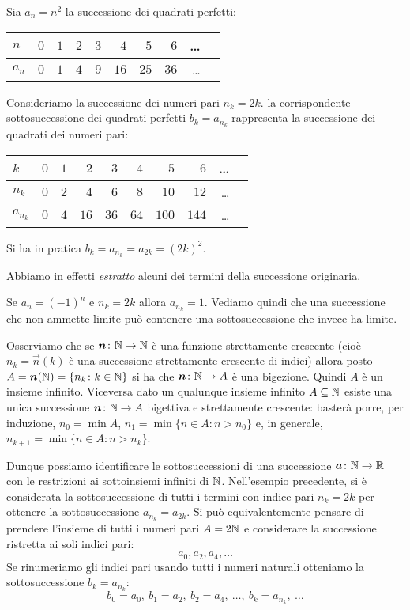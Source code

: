 \begin{example}
Sia $a_n = n^2$ la successione dei quadrati perfetti:
\begin{center}
\begin{tabular}{l|rrrrrrrrr}
$n$   & $0$ & $1$ & $2$ & $3$ & $4$  & $5$  & $6$  & \dots \\ \hline
$a_n$ & $0$ & $1$ & $4$ & $9$ & $16$ & $25$ & $36$ & \dots
\end{tabular}
\end{center}
Consideriamo la successione dei numeri pari $n_k = 2k$.
la corrispondente sottosuccessione dei quadrati perfetti
$b_k = a_{n_k}$
rappresenta la successione dei quadrati dei numeri pari:
\begin{center}
\begin{tabular}{l|rrrrrrrrr}
$k$       & $0$ & $1$ & $2$ & $3$ & $4$  & $5$  & $6$  & \dots \\ \hline
$n_k$ & $0$ & $2$ & $4$ & $6$ & $8$ & $10$ & $12$ & \dots \\
$a_{n_k}$ & $0$ & $4$ & $16$ & $36$ & $64$ & $100$ & $144$ & \dots
\end{tabular}
\end{center}
Si ha in pratica
  $b_k = a_{n_k} = a_{2k} = (2k)^2$.

Abbiamo in effetti \emph{estratto} alcuni dei termini della successione
originaria.
\end{example}

\begin{example}
Se $a_n = (-1)^n$ e $n_k=2k$ allora $a_{n_k} = 1$.
Vediamo quindi che una successione che non ammette limite
può contenere una sottosuccessione che invece ha limite.
\end{example}

Osserviamo che se $\boldsymbol n\colon \mathbb N\to \mathbb N$ è una
funzione strettamente crescente
(cioè $n_k=\vec n(k)$ è una successione strettamente crescente di indici)
allora posto $A=\boldsymbol n(\mathbb N)=\{n_k\colon k\in \mathbb N\}$ si ha che
$\boldsymbol n \colon \mathbb N \to A$ è una bigezione. Quindi $A$ è un insieme infinito.
Viceversa dato un qualunque insieme infinito $A\subseteq \mathbb N$ esiste una
unica successione $\boldsymbol n\colon \mathbb N \to A$ bigettiva e strettamente crescente:
basterà porre, per induzione,
$n_0 = \min A$, $n_1 = \min \{n\in A \colon n > n_0\}$
e, in generale,
 $n_{k+1} = \min\{ n\in A \colon n > n_k\}$.

Dunque possiamo identificare le sottosuccessioni di una successione
$\boldsymbol a \colon \mathbb N \to \mathbb R$ con le restrizioni ai sottoinsiemi infiniti di $\mathbb N$.
Nell'esempio precedente, si è considerata la sottosuccessione
di tutti i termini con indice pari $n_k=2k$ per ottenere la sottosuccessione
$a_{n_k} = a_{2k}$. Si può equivalentemente pensare di prendere l'insieme di
tutti i numeri pari $A=2\mathbb N$ e considerare la successione ristretta ai soli
indici pari:
\[
  a_0, a_2, a_4, \dots
\]
Se rinumeriamo gli indici pari usando tutti i numeri naturali otteniamo
la sottosuccessione $b_k=a_{n_k}$:
\[
  b_0 = a_0,\ b_1 = a_2,\ b_2 = a_4,\ \dots,\ b_k = a_{n_k},\ \dots
\]


